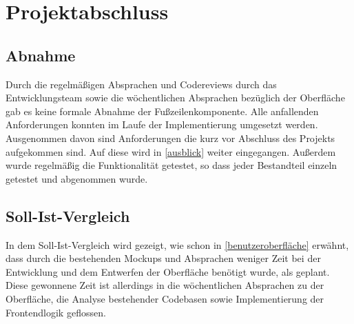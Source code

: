 \section{Projektabschluss}
\label{Projektabschluss}

\subsection{Abnahme}
\label{Abnahme}
Durch die regelmäßigen Absprachen und Codereviews durch das Entwicklungsteam sowie die wöchentlichen Absprachen bezüglich der Oberfläche gab es keine formale Abnahme der Fußzeilenkomponente. Alle anfallenden Anforderungen konnten im Laufe der Implementierung umgesetzt werden. Ausgenommen davon sind Anforderungen die kurz vor Abschluss des Projekts aufgekommen sind. Auf diese wird in \ref{ausblick} weiter eingegangen. Außerdem wurde regelmäßig die Funktionalität getestet, so dass jeder Bestandteil einzeln getestet und abgenommen wurde. 
\subsection{Soll-Ist-Vergleich}
\label{sollIstVgl}
In dem Soll-Ist-Vergleich wird gezeigt, wie schon in \ref{benutzeroberfläche}  erwähnt, dass durch die bestehenden Mockups und Absprachen weniger Zeit bei der Entwicklung und dem Entwerfen der Oberfläche benötigt wurde, als geplant. Diese gewonnene Zeit ist allerdings in die wöchentlichen Absprachen zu der Oberfläche, die Analyse bestehender Codebasen sowie Implementierung der Frontendlogik geflossen.\\


